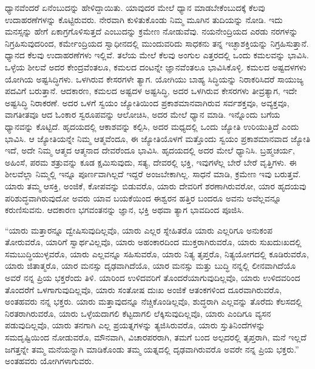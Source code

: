 ಧ್ಯಾನವೆಂದರೆ ಏನೆಂಬುದನ್ನು ಹೇಳಿದ್ದಾಯಿತು. ಯಾವುದರ ಮೇಲೆ ಧ್ಯಾನ ಮಾಡಬೇಕೆಂಬುದಕ್ಕೆ ಕೆಲವು ಉದಾಹರಣೆಗಳನ್ನು ಕೊಟ್ಟಿರುವರು. ನೇರವಾಗಿ ಕುಳಿತುಕೊಂಡು ನಿಮ್ಮ ಮೂಗಿನ ತುದಿಯನ್ನು ನೋಡಿ. ಇದು ಮನಸ್ಸನ್ನು ಹೇಗೆ ಏಕಾಗ್ರಗೊಳಿಸುತ್ತದೆ ಎಂಬುದನ್ನು ಕ್ರಮೇಣ ನೋಡುವೆವು. ನಯನೇಂದ್ರಿಯದ ಎರಡು ನರಗಳನ್ನು ನಿಗ್ರಹಿಸುವುದರಿಂದ, ಕರ್ಮೇಂದ್ರಿಯದ ಸ್ವಾಧೀನದಲ್ಲಿ ಮುಂದುವರಿದು ಸಾಧಕನು ತನ್ನ ಇಚ್ಛಾಶಕ್ತಿಯನ್ನು ನಿಗ್ರಹಿಸುತ್ತಾನೆ. ಧ್ಯಾನದ ಕೆಲವು ಉದಾಹರಣೆಗಳು ಇಲ್ಲಿವೆ. ತಲೆಯ ಮೇಲೆ ಕೆಲವು ಅಂಗುಲ ಎತ್ತರದಲ್ಲಿ ಒಂದು ಕಮಲವನ್ನು ಭಾವಿಸಿ. ಒಳ್ಳೆಯ ಶೀಲವೆ ಅದರ ಕೇಂದ್ರವೆಂತಲೂ, ಕಮಲದ ದಂಟನ್ನೇ ಜ್ಞಾನವೆಂತಲೂ ಭಾವಿಸಿಕೊಳ್ಳಿ. ಕಮಲದ ಅಷ್ಟದಳಗಳು ಯೋಗಿಯ ಅಷ್ಟಸಿದ್ಧಿಗಳು. ಒಳಗಿರುವ ಕೇಸರಗಳೇ ತ್ಯಾಗ. ಯೋಗಿಯು ಬಾಹ್ಯ ಸಿದ್ಧಿಯನ್ನು ನಿರಾಕರಿಸಿದರೆ ಸಾಯುಜ್ಯ ಪದವಿಗೆ ಬರುತ್ತಾನೆ. ಆದಕಾರಣ, ಕಮಲದ ಅಷ್ಟದಳ ಅಷ್ಟಸಿದ್ಧಿ, ಅದರ ಒಳಗಿರುವ ಕೇಸರಗಳು ತೀವ್ರತ್ಯಾಗ, ಇದೇ ಅಷ್ಟಸಿದ್ಧಿ ನಿರಾಕರಣೆ. ಅದರ ಒಳಗೆ ಸ್ವಯಂ ಜ್ಯೋತಿಯಿಂದ ಪ್ರಕಾಶಮಾನವಾಗಿರುವ ಸರ್ವಶಕ್ತವೂ, ಅವ್ಯಕ್ತವೂ, ವಾಗತೀತವೂ ಆದ ಓಂಕಾರ ಸ್ವರೂಪವನ್ನು ಆಲೋಚಿಸಿ, ಅದರ ಮೇಲೆ ಧ್ಯಾನ ಮಾಡಿ. ಇನ್ನೊಂದು ಬಗೆಯ ಧ್ಯಾನವನ್ನು ಕೊಟ್ಟಿದೆ. ಹೃದಯದಲ್ಲಿ ಆಕಾಶವನ್ನು ಕಲ್ಪಿಸಿ, ಅದರ ಮಧ್ಯದಲ್ಲಿ ಒಂದು ಜ್ಯೋತಿ ಉರಿಯುತ್ತಿದೆ ಎಂದು ಭಾವಿಸಿ. ಆ ಜ್ಯೋತಿಯನ್ನೇ ನಿಮ್ಮ ಆತ್ಮವೆಂದೂ, ಈ ಜ್ಯೋತಿಯೊಳಗೆ ಮತ್ತೊಂದು ಸ್ವಯಂ ಪ್ರಕಾಶಮಾನವಾದ ಜ್ಯೋತಿ ಇದೆ, ಅದೇ ನಿಮ್ಮ ಆತ್ಮದ ಆತ್ಮನಾದ ದೇವರೆಂದೂ ಭಾವಿಸಿ. ಹೃದಯದಲ್ಲಿ ಅದರ ಮೇಲೆ ಧ್ಯಾನಿಸಿ. ಬ್ರಹ್ಮಚರ್ಯ, ಅಹಿಂಸೆ, ಪರಮ ಶತ್ರುವನ್ನು ಕೂಡ ಕ್ಷಮಿಸುವುದು, ಸತ್ಯ, ದೇವರಲ್ಲಿ ಭಕ್ತಿ, ಇವುಗಳೆಲ್ಲ ಬೇರೆ ಬೇರೆ ವೃತ್ತಿಗಳು. ಈ ಶೀಲವೆಲ್ಲಾ ನಿಮ್ಮಲ್ಲಿ ಇನ್ನೂ ಪೂರ್ಣವಾಗಿಲ್ಲದೆ ಇದ್ದರೆ ಅಂಜಬೇಕಾಗಿಲ್ಲ. ಸಾಧನೆ ಮಾಡಿ, ಕ್ರಮೇಣ ಇವು ಬರುತ್ತವೆ. ಯಾರು ತಮ್ಮ ಆಸಕ್ತಿ, ಅಂಜಿಕೆ, ಕೋಪವನ್ನು ಬಿಡುವರೊ, ಯಾರು ದೇವರಿಗೆ ಶರಣಾಗಿರುವರೋ, ಯಾರ ಹೃದಯವು ಪರಿಶುದ್ಧವಾಗಿರುವುದೋ ಅವರು ಯಾವ ಬಯಕೆಯಿಂದ ಈಶ್ವರನ ಹತ್ತಿರ ಬಂದರೂ ಅವನು ಅವೆಲ್ಲವನ್ನೂ ಕರುಣಿಸುವನು. ಆದಕಾರಣ ಭಗವಂತನನ್ನು ಜ್ಞಾನ, ಭಕ್ತಿ ಅಥವಾ ತ್ಯಾಗ ಭಾವದಿಂದ ಪೂಜಿಸಿ. 

“ಯಾರು ಮತ್ತಾರನ್ನೂ ದ್ವೇಷಿಸುವುದಿಲ್ಲವೊ, ಯಾರು ಎಲ್ಲರ ಸ್ನೇಹಿತರೊ ಯಾರು ಎಲ್ಲರಿಗೂ ಅನುಕಂಪ ತೋರುವರೊ, ಯಾರಿಗೆ ಸ್ವಾರ್ಥವಿಲ್ಲವೊ, ಯಾರು ಅಹಂಕಾರದಿಂದ ಮುಕ್ತರಾಗಿರುವರೊ, ಯಾರು ಸುಖದುಃಖದಲ್ಲಿ ಸಮಬುದ್ಧಿಯುಳ್ಳವರೊ, ಯಾರು ಎಲ್ಲವನ್ನೂ ಸಹಿಸುವರೊ, ಯಾರು ನಿತ್ಯ ತೃಪ್ತರೊ, ನಿತ್ಯಯೋಗದಲ್ಲಿ ಕೂಡಿರುವರೊ, ಯಾರು ಜಿತಾತ್ಮರೊ, ಯಾರ ಮನಸ್ಸು ದೃಢವಾಗಿದೆಯೊ, ಯಾರ ಮನಸ್ಸು ಮತ್ತು ಬುದ್ಧಿ ನನ್ನಲ್ಲಿ ಲೀನವಾಗಿದೆಯೊ ಅವರೆ ನನ್ನ ಪ್ರಿಯ ಭಕ್ತರೆಂದು ತಿಳಿ. ಯಾರಿಂದ ಉಳಿದವರಿಗೆ ತೊಂದರೆಯಾಗುವುದಿಲ್ಲವೊ, ಯಾರು ಉಳಿದವರಿಂದ ತೊಂದರೆಗೆ ಒಳಗಾಗುವುದಿಲ್ಲವೊ, ಯಾರು ಸಂತೋಷ ದುಃಖ ಅಂಜಿಕೆ ಆತಂಕಗಳಿಂದ ದೂರವಾಗಿರುವರೊ, ಅಂತಹವರು ನನ್ನ ಭಕ್ತರು. ಯಾರು ಮತ್ತಾವುದನ್ನೂ ನೆಚ್ಚಿಕೊಂಡಿಲ್ಲವೊ, ಶುದ್ಧರಾಗಿ ಎಲ್ಲವನ್ನು ತೊರೆದು ಕೆಲಸದಲ್ಲಿ ನಿರತರಾಗಿರುವರೊ, ಯಾರು ಒಳ್ಳೆಯದಾಗಲಿ ಕೆಟ್ಟದಾಗಲಿ ಲೆಕ್ಕಿಸುವುದಿಲ್ಲವೊ, ಯಾರು ಎಂದಿಗೂ ವ್ಯಸನ ಪಡುವುದಿಲ್ಲವೊ, ಯಾರು ತನಗಾಗಿ ಎಲ್ಲ ಪ್ರಯತ್ನಗಳನ್ನು ತ್ಯಜಿಸಿರುವರೊ, ಯಾರು ಸ್ತುತಿನಿಂದೆಗಳನ್ನು ಸಮದೃಷ್ಟಿಯಿಂದ ನೋಡುವರೊ, ಮೌನವಾಗಿ, ವಿಚಾರಪರರಾಗಿ, ತಮಗೆ ಬಂದ ಅಲ್ಪದರಲ್ಲಿ ತೃಪ್ತರಾಗಿ, ಮನೆ ಇಲ್ಲದೆ ಜಗತ್ತನ್ನೇ ತಮ್ಮ ಮನೆಯನ್ನಾಗಿ ಮಾಡಿಕೊಂಡು ತಮ್ಮ ಯತ್ನದಲ್ಲಿ ದೃಢವಾಗಿರುವರೊ ಅವರೇ ನನ್ನ ಪ್ರಿಯ ಭಕ್ತರು.” ಅಂತಹವರು ಯೋಗಿಗಳಾಗುವರು. 

\vskip 0.3cm 

